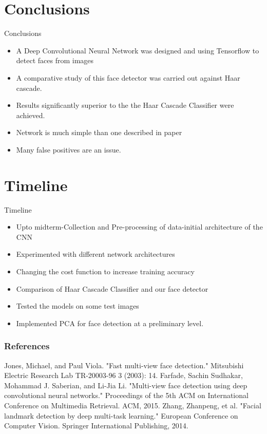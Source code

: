 \documentclass{beamer}
\begin{document}
\section{Conclusions}
\begin{frame}{Conclusions}
  \begin{itemize}
    \item A Deep Convolutional Neural Network was designed and using Tensorflow to detect faces from images
    \item A comparative study of this face detector was carried out against Haar cascade.
    \item Results significantly superior to the the Haar Cascade Classifier were achieved.
    \item Network is much simple than one described in paper\cite{paper}
    \item Many false positives are an issue.
  \end{itemize}
\end{frame}

\section{Timeline}
\begin{frame}{Timeline}
  \begin{itemize}
    \item Upto midterm-Collection and Pre-processing of data-initial architecture of the CNN 
    \item Experimented with different network architectures
    \item Changing the cost function to increase training accuracy
    \item Comparison of Haar Cascade Classifier and our face detector
    \item Tested the models on some test images
    \item Implemented PCA for face detection at a preliminary level.
  \end{itemize}
\end{frame}


\begin{frame}[allowframebreaks]
  \frametitle<presentation>{References}

  \begin{thebibliography}{99}
  \setlength{\itemsep}{0\parskip}
  Jones, Michael, and Paul Viola. "Fast multi-view face detection." Mitsubishi Electric Research Lab TR-20003-96 3 (2003): 14.
  Farfade, Sachin Sudhakar, Mohammad J. Saberian, and Li-Jia Li. "Multi-view face detection using deep convolutional neural networks." Proceedings of the 5th ACM on International Conference on Multimedia Retrieval. ACM, 2015.
  Zhang, Zhanpeng, et al. "Facial landmark detection by deep multi-task learning." European Conference on Computer Vision. Springer International Publishing, 2014.
  \end{thebibliography}
\end{frame}
\end{document}
